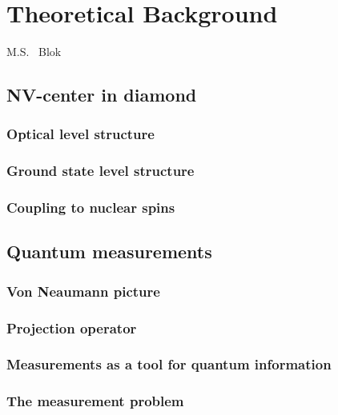 \graphicspath{{./ch_theory/figures/}}

\chapter{Theoretical Background}
\label{ch:theory}

\begin{center} 
    \vspace{-1cm} {M.S. ~Blok} 
\end{center}
\section{NV-center in diamond}
\subsection{Optical level structure}
\subsection{Ground state level structure}
\subsection{Coupling to nuclear spins}

\section{Quantum measurements}
\subsection{Von Neaumann picture}
\subsection{Projection operator}
\subsection{Measurements as a tool for quantum information}
\subsection{The measurement problem}


\clearpage



